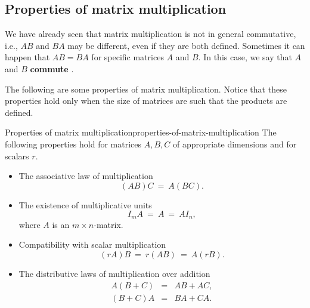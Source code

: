 \subsection{Properties of matrix multiplication}

We have already seen that matrix multiplication is not in general
commutative, i.e., $AB$ and $BA$ may be different, even if they are
both defined. Sometimes it can happen that $AB=BA$ for specific
matrices $A$ and $B$. In this case, we say that $A$ and $B$
\textbf{commute}%
%
.

The following are some properties of matrix multiplication.  Notice
that these properties hold only when the size of matrices are such
that the products are defined.

\begin{theorem}{Properties of matrix multiplication}{properties-of-matrix-multiplication}
  The following properties hold%
   for matrices $A,B,C$
  of appropriate dimensions and for scalars $r$.
  \begin{itemize}
  \item The associative law of multiplication
    \begin{equation*}
      (AB)C ~=~ A(BC).
    \end{equation*}
  \item The existence of multiplicative units
    \begin{equation*}
      I_mA ~=~ A ~=~ AI_n,
    \end{equation*}
    where $A$ is an $m\times n$-matrix.
  \item Compatibility with scalar multiplication
    \begin{equation*}
      (rA)B ~=~ r(AB) ~=~ A(rB).
    \end{equation*}
  \item The distributive laws of multiplication over addition
    \begin{eqnarray*}
      A(B+C) &=& AB + AC, \\
      (B+C)A &=& BA + CA.
    \end{eqnarray*}
  \end{itemize}
\end{theorem}

